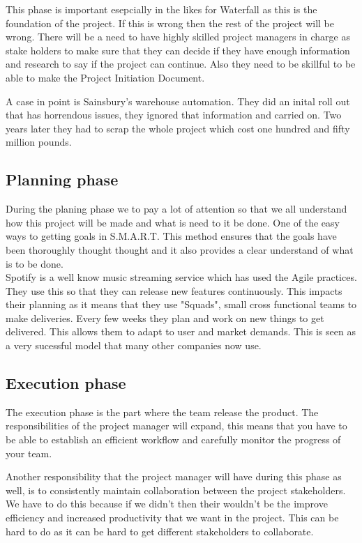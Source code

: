 \documentclass{article}
\begin{document}
This phase is important esepcially in the likes for Waterfall as this is the foundation of the project. If this is wrong then the rest of the project will be wrong.
There will be a need to have highly skilled project managers in charge as stake holders to make sure that they can decide if they have enough information and research to say if the project can continue.
Also they need to be skillful to be able to make the Project Initiation Document.

A case in point is Sainsbury's warehouse automation. They did an inital roll out that has horrendous issues, they ignored that information and carried on. Two years later they had to scrap the whole project which cost one hundred and fifty million pounds. \cite{Sainsbury}



\subsection{Planning phase}
During the planing phase we to pay a lot of attention so that we all understand how this project will be made and what is need to it be done. One of the easy ways to getting goals in S.M.A.R.T. This method ensures that the goals have been thoroughly thought thought and it also provides a clear understand of what is to be done. \\

Spotify is a well know music streaming service which has used the Agile practices. They use this so that they can release new features continuously.
This impacts their planning as it means that they use "Squads", small cross functional teams to make deliveries. Every few weeks they plan and work on new things to get delivered. This allows them to adapt to user and market demands. \cite{spotify} This is seen as a very sucessful model that many other companies now use.


\subsection{Execution phase}
The execution phase is the part where the team release the product. The responsibilities of the project manager will expand, this means that you have to be able to establish an efficient workflow and carefully monitor the progress of your team. 

Another responsibility that the project manager will have during this phase as well, is to consistently maintain collaboration between the project stakeholders. We have to do this because if we didn't then their wouldn't be the improve efficiency and increased productivity that we want in the project. This can be hard to do as it can be hard to get different stakeholders to collaborate.
\end{document}
